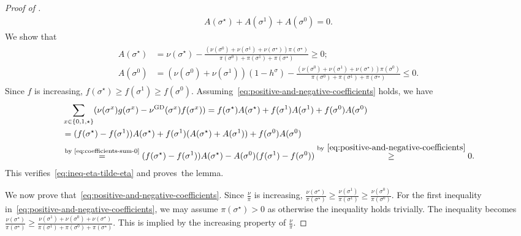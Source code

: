 \documentclass[11pt,a4paper]{article}
\theoremstyle{definition}
\newcommand{\nug}{\nu^{\textnormal{GD}}}
\begin{document}
\begin{proof}[Proof of ]
\begin{align}\label{eq:coefficients-sum-0}
A(\sigma^\star) + A(\sigma^1) + A(\sigma^0) = 0.
\end{align}
We show that 
\begin{align}\label{eq:positive-and-negative-coefficients}
\begin{split}
A(\sigma^\star) &= \nu(\sigma^\star)-\frac{(\nu(\sigma^0)+\nu(\sigma^1)+\nu(\sigma^\star))\pi(\sigma^\star)}{\pi(\sigma^0)+\pi(\sigma^1)+\pi(\sigma^\star)}\geq 0;\\
A(\sigma^0) &= (\nu(\sigma^0)+\nu(\sigma^1))(1-h^\sigma) -\frac{(\nu(\sigma^0)+\nu(\sigma^1)+\nu(\sigma^\star))\pi(\sigma^0)}{\pi(\sigma^0)+\pi(\sigma^1)+\pi(\sigma^\star)}\leq 0.    
\end{split}
\end{align}
Since $f$ is increasing, $f(\sigma^\star)\geq f(\sigma^1)\geq f(\sigma^0)$. Assuming~\eqref{eq:positive-and-negative-coefficients} holds, we have
\begin{align*}
    &\sum_{x\in \{0,1,\star\}}(\nu(\sigma^x) g(\sigma^x)-\nug(\sigma^x) f(\sigma^x)) =    f(\sigma^\star)A(\sigma^\star) + f(\sigma^1)A(\sigma^1) + f(\sigma^0)A(\sigma^0)\\
    &= (f(\sigma^\star) - f(\sigma^1))A(\sigma^\star) + f(\sigma^1)(A(\sigma^\star) + A(\sigma^1))+ f(\sigma^0)A(\sigma^0)\\
    &\overset{{\text{by~\eqref{eq:coefficients-sum-0}}}}{=} (f(\sigma^\star) - f(\sigma^1))A(\sigma^\star) - A(\sigma^0)(f(\sigma^1)-f(\sigma^0)) \overset{\text{by}~\eqref{eq:positive-and-negative-coefficients}}{\geq} 0.
\end{align*}
This verifies~\eqref{eq:ineq-eta-tilde-eta} and proves~the lemma.


We now prove that~\eqref{eq:positive-and-negative-coefficients}.
Since $\frac{\nu}{\pi}$ is increasing, $\frac{\nu(\sigma^\star)}{\pi(\sigma^\star)}\geq \frac{\nu(\sigma^1)}{\pi(\sigma^1)}\geq \frac{\nu(\sigma^0)}{\pi(\sigma^0)}$. 
For the first inequality in~\eqref{eq:positive-and-negative-coefficients}, we may assume $\pi(\sigma^\star) > 0$ as otherwise the inequality holds trivially. The inequality becomes
$\frac{\nu(\sigma^\star)}{\pi(\sigma^\star)}\geq \frac{\nu(\sigma^1)+\nu(\sigma^0)+\nu(\sigma^\star)}{\pi(\sigma^1)+\pi(\sigma^0)+\pi(\sigma^\star)}$. This is implied by the increasing property of $\frac{\nu}{\pi}$.


\end{proof}
\end{document}
